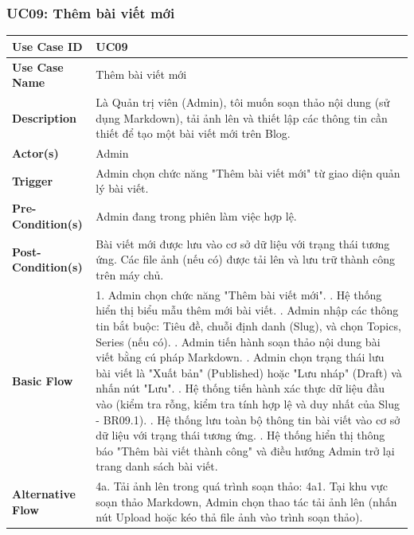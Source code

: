 \documentclass[a4paper,12pt]{article}
\begin{document}
\subsubsection{UC09: Thêm bài viết mới}
\begin{longtable}{|p{4cm}|p{11.5cm}|}
\hline
\textbf{Use Case ID} & UC09 \\ \hline
\textbf{Use Case Name} & Thêm bài viết mới \\ \hline
\textbf{Description} & Là Quản trị viên (Admin), tôi muốn soạn thảo nội dung (sử dụng Markdown), tải ảnh lên và thiết lập các thông tin cần thiết để tạo một bài viết mới trên Blog. \\ \hline
\textbf{Actor(s)} & Admin \\ \hline
\textbf{Trigger} & Admin chọn chức năng "Thêm bài viết mới" từ giao diện quản lý bài viết. \\ \hline
\textbf{Pre-Condition(s)} & Admin đang trong phiên làm việc hợp lệ. \\ \hline
\textbf{Post-Condition(s)} & Bài viết mới được lưu vào cơ sở dữ liệu với trạng thái tương ứng. Các file ảnh (nếu có) được tải lên và lưu trữ thành công trên máy chủ. \\ \hline
\textbf{Basic Flow} & 
1. Admin chọn chức năng "Thêm bài viết mới". \newline
2. Hệ thống hiển thị biểu mẫu thêm mới bài viết. \newline
3. Admin nhập các thông tin bắt buộc: Tiêu đề, chuỗi định danh (Slug), và chọn Topics, Series (nếu có). \newline
4. Admin tiến hành soạn thảo nội dung bài viết bằng cú pháp Markdown. \newline
5. Admin chọn trạng thái lưu bài viết là "Xuất bản" (Published) hoặc "Lưu nháp" (Draft) và nhấn nút "Lưu". \newline
6. Hệ thống tiến hành xác thực dữ liệu đầu vào (kiểm tra rỗng, kiểm tra tính hợp lệ và duy nhất của Slug - BR09.1). \newline
7. Hệ thống lưu toàn bộ thông tin bài viết vào cơ sở dữ liệu với trạng thái tương ứng. \newline
8. Hệ thống hiển thị thông báo "Thêm bài viết thành công" và điều hướng Admin trở lại trang danh sách bài viết. \\ \hline
\textbf{Alternative Flow} & 
4a. Tải ảnh lên trong quá trình soạn thảo: \newline
4a1. Tại khu vực soạn thảo Markdown, Admin chọn thao tác tải ảnh lên (nhấn nút Upload hoặc kéo thả file ảnh vào trình soạn thảo). \newline

\end{longtable}
\end{document}
